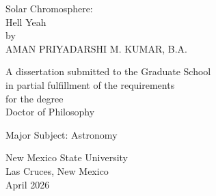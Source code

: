 \begin{center}
Solar Chromosphere:\\
 Hell Yeah\\
\bigskip
by\\
\bigskip
AMAN PRIYADARSHI M. KUMAR, B.A.
\end{center}
\vspace{1.0in}
\begin{center}
A dissertation submitted to the Graduate School\\
\bigskip
in partial fulfillment of the requirements\\
\bigskip
for the degree\\
\bigskip
Doctor of Philosophy
\end{center}
\bigskip
\begin{center}
Major Subject: Astronomy
\end{center}
\vspace{1.0in}
\begin{center}
New Mexico State University\\
\bigskip
Las Cruces, New Mexico\\
\bigskip
April 2026 %
\end{center}

